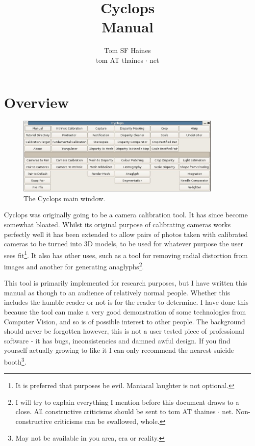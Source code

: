 \documentclass[10pt,a4paper,twoside]{article}
\author {Tom SF Haines \\ tom AT thaines $\cdot$ net}
\title {Cyclops\\Manual}
\begin{document}
\maketitle
\tableofcontents
\newpage



\section{Overview}

\begin{figure}[t]
 \centering
 \includegraphics[width=0.9\textwidth]{screenshots/main_window}
 \vspace{-0.2cm}
 \caption{The Cyclops main window.}
 \label{fig:main_window}
\end{figure}  

Cyclops was originally going to be a camera calibration tool. It has since become somewhat bloated. Whilst its original purpose of calibrating cameras works perfectly well it has been extended to allow pairs of photos taken with calibrated cameras to be turned into 3D models, to be used for whatever purpose the user sees fit\footnote{It is preferred that purposes be evil. Maniacal laughter is not optional.}. It also has other uses, such as a tool for removing radial distortion from images and another for generating anaglyphs\footnote{I will try to explain everything I mention before this document draws to a close. All constructive criticisms should be sent to tom AT thaines $\cdot$ net. Non-constructive criticisms can be swallowed, whole.}.

This tool is primarily implemented for research purposes, but I have written this manual as though to an audience of relatively normal people. Whether this includes the humble reader or not is for the reader to determine. I have done this because the tool can make a very good demonstration of some technologies from Computer Vision, and so is of possible interest to other people. The background should never be forgotten however, this is not a user tested piece of professional software - it has bugs, inconsistencies and damned awful design. If you find yourself actually growing to like it I can only recommend the nearest suicide booth\footnote{May not be available in you area, era or reality.}.
\end{document}
